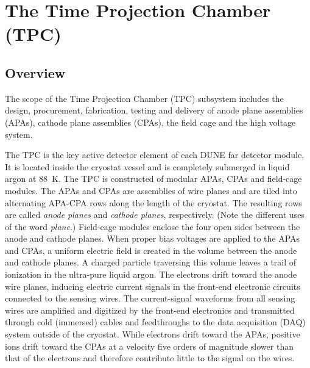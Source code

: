 
\section{The Time Projection Chamber (TPC)} 
\label{sec:detectors-fd-ref-tpc}

\subsection{Overview}

The scope of the Time Projection Chamber (TPC) subsystem includes the
design, procurement, fabrication, testing and delivery of anode plane
assemblies (APAs), cathode plane assemblies (CPAs), the field cage and
the high voltage system.

The TPC is the key active detector element of each DUNE
far detector module. It is located inside the cryostat vessel and is
completely submerged in liquid argon at 88~K. 
The TPC is constructed of modular APAs, CPAs and field-cage modules. The APAs and CPAs are assemblies of
wire planes and are tiled into alternating APA-CPA rows along the length of
the cryostat. The resulting rows are called \textit{anode planes} and \textit{cathode planes}, respectively.
(Note the different uses of the word \textit{plane}.)  Field-cage modules enclose the four open sides between
the anode and cathode planes.  
%
When proper bias voltages are applied
to the APAs and CPAs, a uniform electric field is created in the volume
between the anode and cathode planes. A charged particle traversing
this volume leaves a trail of ionization in the ultra-pure liquid
argon.  The electrons drift toward the anode wire planes, inducing
electric current signals in the front-end electronic circuits
connected to the sensing wires.  The current-signal waveforms from all
sensing wires are amplified and digitized by the front-end electronics
and transmitted through cold (immersed) cables and feedthroughs to the data
acquisition (DAQ) system outside of the cryostat. While electrons drift
toward the APAs, positive ions drift toward the CPAs at a velocity five orders of 
magnitude slower than that of the electrons and therefore contribute little to the signal on the wires.  



